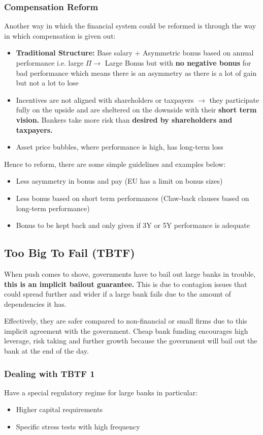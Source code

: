 \documentclass[12pt, letterpaper]{article}
\begin{document}
\subsubsection{Compensation Reform}
Another way in which the financial system could be reformed is through the way in which compensation is given out:
\begin{itemize}
	\item \textbf{Traditional Structure:} Base salary + Asymmetric bonus based on annual performance i.e. large $\Pi \rightarrow$ Large Bonus but with \textbf{no negative bonus} for bad performance which means there is an asymmetry as there is a lot of gain but not a lot to lose
	\item Incentives are not aligned with shareholders or taxpayers $\rightarrow$ they participate fully on the upside and are sheltered on the downside with their \textbf{short term vision.} Bankers take more risk than \textbf{desired by shareholders and taxpayers.}
	\item Asset price bubbles, where performance is high, has long-term loss
\end{itemize}
Hence to reform, there are some simple guidelines and examples below:
\begin{itemize}
	\item Less asymmetry in bonus and pay (EU has a limit on bonus sizes)
	\item Less bonus based on short term performances (Claw-back clauses based on long-term performance)
	\item Bonus to be kept back and only given if 3Y or 5Y performance is adequate
\end{itemize}

\subsection{Too Big To Fail (TBTF)}
When push comes to shove, governments have to bail out large banks in trouble, \textbf{this is an implicit bailout guarantee.} This is due to contagion issues that could spread further and wider if a large bank fails due to the amount of dependencies it has.

Effectively, they are safer compared to non-financial or small firms due to this implicit agreement with the government. Cheap bank funding encourages high leverage, risk taking and further growth because the government will bail out the bank at the end of the day.

\subsubsection{Dealing with TBTF 1}
Have a special regulatory regime for large banks in particular:
\begin{itemize}
	\item Higher capital requirements
	\item Specific stress tests with high frequency
\end{itemize}
\end{document}
